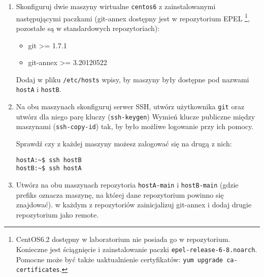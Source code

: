 \documentclass[polish]{article}
\newif\ifteacher
\begin{document}
\begin{enumerate}

    \item
    Skonfiguruj dwie maszyny wirtualne \texttt{centos6} z zainstalowanymi
    następującymi paczkami (git-annex dostępny jest w repozytorium EPEL
    \footnote{CentOS6.2 dostępny w laboratorium nie posiada go w repozytorium.
        Konieczne jest ściągnięcie i zainstalowanie paczki
        \texttt{epel-release-6-8.noarch}. Pomocne może być także uaktualnienie
        certyfikatów: \texttt{yum upgrade ca-certificates}.},
    pozostałe są w standardowych repozytoriach):

    \begin{itemize}
      \item git >= 1.7.1
      \item git-annex >= 3.20120522
    \end{itemize}

    Dodaj w pliku \texttt{/etc/hosts} wpisy, by maszyny były dostępne pod
    nazwami \texttt{hostA} i \texttt{hostB}.

\ifteacher
    \begin{lstlisting}[frame=single, caption=Wynik]
yum upgrade ca-certificates

wget http://download.fedoraproject.org/pub/epel/6/x86_64/ \
     epel-release-6-8.noarch.rpm
rpm -ivh epel-release-6-8.noarch.rpm

hostA:~$ ssh-keygen
hostA:~$ cat 'root123' | ssh-copy-id root@hostB

hostB:~$ ssh-keygen
hostB:~$ cat 'root123' | ssh-copy-id root@hostA
    \end{lstlisting}
\fi

    \item
    Na obu maszynach skonfiguruj serwer SSH, utwórz użytkownika \texttt{git}
    oraz utwórz dla niego parę kluczy (\texttt{ssh-keygen}) Wymień klucze
    publiczne między maszynami (\texttt{ssh-copy-id}) tak, by było możliwe
    logowanie przy ich pomocy.

    Sprawdź czy z każdej maszyny możesz zalogować się na drugą z nich:

    \begin{lstlisting}
hostA:~$ ssh hostB
hostB:~$ ssh hostA
    \end{lstlisting}

    \item
    Utwórz na obu maszynach repozytoria \texttt{hostA-main} i
    \texttt{hostB-main} (gdzie prefiks oznacza maszynę, na której dane
    repozytorium powinno się znajdować). w każdym z repozytoriów zainicjalizuj
    git-annex i dodaj drugie repozytorium jako remote.


\end{enumerate}
\end{document}
